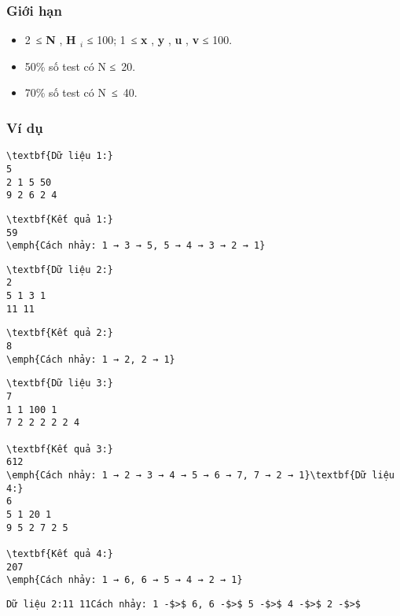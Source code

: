 \subsubsection{   Giới hạn  }
\begin{itemize}
	\item     2 ≤    \textbf{     N    }    ,    \textbf{     H     $_      i     $}    ≤ 100; 1 ≤    \textbf{     x    }    ,    \textbf{     y    }    ,    \textbf{     u    }    ,    \textbf{     v    }    ≤ 100.   
	\item     50\% số test có N ≤ 20.   
	\item     70\% số test có N ≤ 40.   
\end{itemize}

\subsubsection{   Ví dụ  }
\begin{verbatim}
\textbf{Dữ liệu 1:}
5
2 1 5 50
9 2 6 2 4\end{verbatim}
\begin{verbatim}
\textbf{Kết quả 1:}
59
\emph{Cách nhảy: 1 → 3 → 5, 5 → 4 → 3 → 2 → 1}\end{verbatim}
\begin{verbatim}
\textbf{Dữ liệu 2:}
2
5 1 3 1
11 11\end{verbatim}
\begin{verbatim}
\textbf{Kết quả 2:}
8
\emph{Cách nhảy: 1 → 2, 2 → 1}\end{verbatim}
\begin{verbatim}
\textbf{Dữ liệu 3:}
7
1 1 100 1
7 2 2 2 2 2 4

\textbf{Kết quả 3:}
612
\emph{Cách nhảy: 1 → 2 → 3 → 4 → 5 → 6 → 7, 7 → 2 → 1}\textbf{Dữ liệu 4:}
6
5 1 20 1
9 5 2 7 2 5

\textbf{Kết quả 4:}
207
\emph{Cách nhảy: 1 → 6, 6 → 5 → 4 → 2 → 1}\end{verbatim}
\begin{verbatim}
Dữ liệu 2:11 11Cách nhảy: 1 -$>$ 6, 6 -$>$ 5 -$>$ 4 -$>$ 2 -$>$ \end{verbatim}